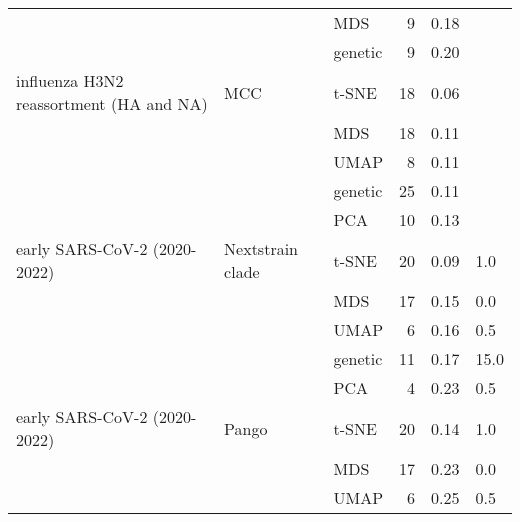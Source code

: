 \begin{tabular}{lllrrl}
                                        &                    &     MDS &                   9 &                           0.18 &           \\
                                        &                    & genetic &                   9 &                           0.20 &           \\
influenza H3N2 reassortment (HA and NA) &                MCC &   t-SNE &                  18 &                           0.06 &           \\
                                        &                    &     MDS &                  18 &                           0.11 &           \\
                                        &                    &    UMAP &                   8 &                           0.11 &           \\
                                        &                    & genetic &                  25 &                           0.11 &           \\
                                        &                    &     PCA &                  10 &                           0.13 &           \\
           early SARS-CoV-2 (2020-2022) &   Nextstrain clade &   t-SNE &                  20 &                           0.09 &       1.0 \\
                                        &                    &     MDS &                  17 &                           0.15 &       0.0 \\
                                        &                    &    UMAP &                   6 &                           0.16 &       0.5 \\
                                        &                    & genetic &                  11 &                           0.17 &      15.0 \\
                                        &                    &     PCA &                   4 &                           0.23 &       0.5 \\
           early SARS-CoV-2 (2020-2022) &              Pango &   t-SNE &                  20 &                           0.14 &       1.0 \\
                                        &                    &     MDS &                  17 &                           0.23 &       0.0 \\
                                        &                    &    UMAP &                   6 &                           0.25 &       0.5 \\

\end{tabular}
